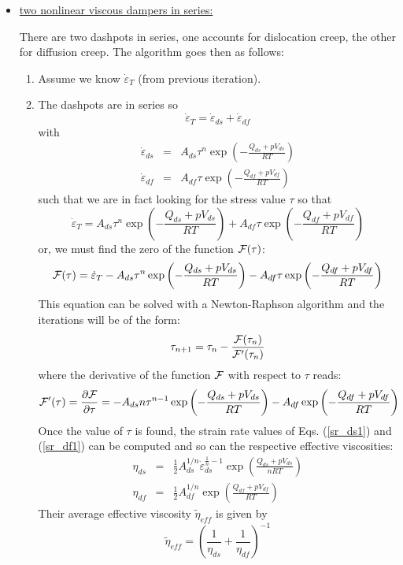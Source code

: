 \begin{itemize}
\item \underline{two nonlinear viscous dampers in series:} 

\begin{center}

\end{center}

There are two dashpots in series, one accounts for dislocation creep, the other for diffusion creep.
The algorithm goes then as follows:
\begin{enumerate}
\item Assume we know $\dot\varepsilon_T$ (from previous iteration). 
\item The dashpots are in series so 
\[
\dot\varepsilon_T = \dot\varepsilon_{ds} + \dot\varepsilon_{df} 
\]
with
\begin{eqnarray}
\dot\varepsilon_{ds}  &=& A_{ds} \tau^n \exp \left(-\frac{Q_{ds}+pV_{ds}}{RT}\right) \label{sr_ds1} \\
\dot\varepsilon_{df}  &=& A_{df} \tau   \exp \left(-\frac{Q_{df}+pV_{df}}{RT}\right) \label{sr_df1} 
\end{eqnarray}
such that we are in fact looking for the stress value $\tau$ so that 
\[
\dot\varepsilon_T = 
A_{ds} \tau^n \exp \left(-\frac{Q_{ds}+p V_{ds}}{RT}\right) 
+
A_{df} \tau   \exp \left(-\frac{Q_{df}+p V_{df}}{RT}\right) 
\]
or, we must find the zero of the function ${\cal F}(\tau)$: 
\[
{\cal F}(\tau) =  \dot\varepsilon_T 
- A_{ds} \tau^n \exp \left(-\frac{Q_{ds}+p V_{ds}}{RT}\right) 
- A_{df} \tau   \exp \left(-\frac{Q_{df}+p V_{df}}{RT}\right) 
\]
This equation can be solved with a Newton-Raphson algorithm
and the iterations will be of the form:
\[
\tau_{n+1} = \tau_n - \frac{{\cal F}(\tau_n)}{{\cal F}'(\tau_n)}
\]
where the derivative of the function ${\cal F}$ with respect to $\tau$ reads:
\[
{\cal F}'(\tau)=\frac{\partial {\cal F}}{\partial \tau}=
- A_{ds} n \tau^{n-1} \exp\left(-\frac{Q_{ds}+pV_{ds}}{RT}\right)
- A_{df} \exp\left(-\frac{Q_{df}+pV_{df}}{RT}\right) 
\]
Once the value of $\tau$ is found, 
the strain rate values of Eqs. (\ref{sr_ds1}) and (\ref{sr_df1})
can be computed and so can the respective effective viscosities:
\begin{eqnarray}
\eta_{ds} 
&=& \frac{1}{2} A_{ds}^{1/n} \dot\varepsilon_{ds}^{\frac{1}{n}-1} \exp \left(\frac{Q_{ds}+pV_{ds}}{nRT}\right) \\
\eta_{df} 
&=& \frac{1}{2} A_{df}^{1/n}  \exp \left(\frac{Q_{df}+pV_{df}}{RT}\right) 
\end{eqnarray}
Their average effective viscosity $\tilde{\eta}_{eff}$ is given by 
\[
\tilde{\eta}_{eff} = \left( \frac{1}{\eta_{ds}} + \frac{1}{\eta_{df}} \right)^{-1}
\]
\end{enumerate}



\end{itemize}
